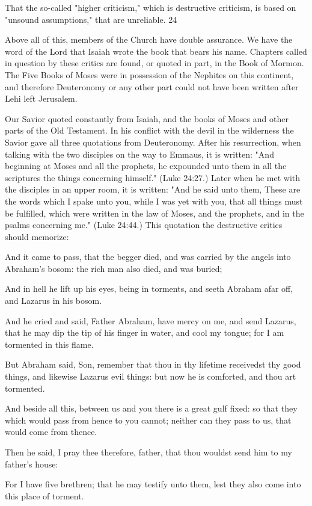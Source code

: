 That the so-called "higher criticism," which is destructive criticism, is based on "unsound
assumptions," that are unreliable. 24

Above all of this, members of the Church have double assurance. We have the word of the
Lord that Isaiah wrote the book that bears his name. Chapters called in question by these
critics are found, or quoted in part, in the Book of Mormon. The Five Books of Moses were
in possession of the Nephites on this continent, and therefore Deuteronomy or any other part
could not have been written after Lehi left Jerusalem.

Our Savior quoted constantly from Isaiah, and the books of Moses and other parts of the Old
Testament. In his conflict with the devil in the wilderness the Savior gave all three quotations
from Deuteronomy. After his resurrection, when talking with the two disciples on the way to
Emmaus, it is written: "And beginning at Moses and all the prophets, he expounded unto
them in all the scriptures the things concerning himself." (Luke 24:27.) Later when he met
with the disciples in an upper room, it is written: "And he said unto them, These are the
words which I spake unto you, while I was yet with you, that all things must be fulfilled,
which were written in the law of Moses, and the prophets, and in the psalms concerning me."
(Luke 24:44.) This quotation the destructive critics should memorize:

And it came to pass, that the begger died, and was carried by the angels into Abraham's
bosom: the rich man also died, and was buried;

And in hell he lift up his eyes, being in torments, and seeth Abraham afar off, and Lazarus in
his bosom.

And he cried and said, Father Abraham, have mercy on me, and send Lazarus, that he may
dip the tip of his finger in water, and cool my tongue; for I am tormented in this flame.

But Abraham said, Son, remember that thou in thy lifetime receivedst thy good things, and
likewise Lazarus evil things: but now he is comforted, and thou art tormented.

And beside all this, between us and you there is a great gulf fixed: so that they which would
pass from hence to you cannot; neither can they pass to us, that would come from thence.

Then he said, I pray thee therefore, father, that thou wouldst send him to my father's house:

For I have five brethren; that he may testify unto them, lest they also come into this place of
torment.

